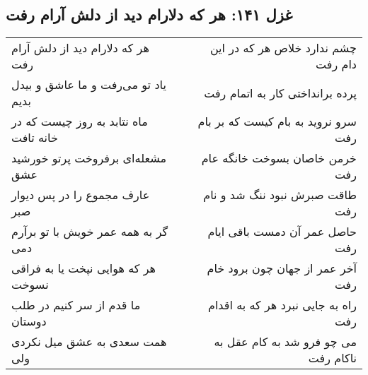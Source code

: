 \begin{center}
\section*{غزل ۱۴۱: هر که دلارام دید از دلش آرام رفت}
\label{sec:141}
\begin{longtable}{l p{0.5cm} r}
هر که دلارام دید از دلش آرام رفت
&&
چشم ندارد خلاص هر که در این دام رفت
\\
یاد تو می‌رفت و ما عاشق و بیدل بدیم
&&
پرده برانداختی کار به اتمام رفت
\\
ماه نتابد به روز چیست که در خانه تافت
&&
سرو نروید به بام کیست که بر بام رفت
\\
مشعله‌ای برفروخت پرتو خورشید عشق
&&
خرمن خاصان بسوخت خانگه عام رفت
\\
عارف مجموع را در پس دیوار صبر
&&
طاقت صبرش نبود ننگ شد و نام رفت
\\
گر به همه عمر خویش با تو برآرم دمی
&&
حاصل عمر آن دمست باقی ایام رفت
\\
هر که هوایی نپخت یا به فراقی نسوخت
&&
آخر عمر از جهان چون برود خام رفت
\\
ما قدم از سر کنیم در طلب دوستان
&&
راه به جایی نبرد هر که به اقدام رفت
\\
همت سعدی به عشق میل نکردی ولی
&&
می چو فرو شد به کام عقل به ناکام رفت
\\
\end{longtable}
\end{center}
